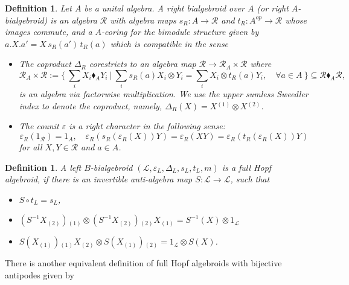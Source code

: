 \documentclass[a4paper,reqno]{amsart}
\numberwithin{equation}{section}
\theoremstyle{plain}
\newtheorem{defi}[thm]{Definition}
\theoremstyle{remark}
\numberwithin{equation}{section}
\newcommand{\ot}{\otimes}
\newcommand{\cL}{\mathcal{L}}
\newcommand{\cR}{\mathcal{R}}
\newcommand{\one}[1]{{#1}{}_{\scriptscriptstyle{(1)}}}
\newcommand{\two}[1]{{#1}{}_{\scriptscriptstyle{(2)}}}
\newcommand{\teins}[1]{{#1}{}{}^{\scriptscriptstyle{(1)}}}
\newcommand{\tzwei}[1]{{#1}{}{}^{\scriptscriptstyle{(2)}}}
\begin{document}
\begin{defi}\label{def:right.bgd} Let $A$ be a unital algebra. A right bialgebroid over $A$ (or right $A$-bialgebroid) is an algebra $\cR$ with  algebra maps $s_{R}:A\to \cR$ and $t_{R}:A^{op}\to \cR$ whose images commute,  and a $A$-coring for the bimodule structure given by $a.X.a'=X\,s_{R}(a')\,t_{R}(a)$ which is compatible in the sense
\begin{itemize}
\item[(i)] The coproduct $\Delta_{R}$ corestricts to an algebra map  $\cR\to \cR{}_{A}\times \cR$ where
\begin{equation*} \cR{}_{A}\times \cR :=\{\ \sum_i X_i \blacklozenge_{A} Y_i\ |\ \sum_i s_{R}(a)X_i \ot Y_i=
\sum_i X_i \ot  t_{R}(a)Y_i  ,\quad \forall a\in A\ \}\subseteq \cR\blacklozenge_{A}\cR,
\end{equation*}
 is an algebra via factorwise multiplication. We use the upper sumless Sweedler index to denote the coproduct, namely, $\Delta_{R}(X)=X\teins{}\ot X\tzwei{}$.
\item[(ii)] The counit $\varepsilon$ is a right character in the following sense:
\begin{equation*}\varepsilon_{R}(1_{\cR})=1_{A},\quad \varepsilon_{R}(s_{R}(\varepsilon_{R}(X))Y)=\varepsilon_{R}(XY)=\varepsilon_{R}(t_{R}(\varepsilon_{R}(X))Y)\end{equation*}
for all $X,Y\in \cR$ and $a\in A$.
\end{itemize}
\end{defi}

\begin{defi}\label{def. full Hopf algebroid1}
    A left $B$-bialgebroid $(\cL, \varepsilon_{L}, \Delta_{L}, s_{L}, t_{L}, m)$ is a full Hopf algebroid, if there is an invertible anti-algebra map $S:\cL\to \cL$, such that
    \begin{itemize}
        \item [(i)] $S\circ t_{L}=s_{L}$,
        \item [(ii)] $\one {(S^{-1}\two{X})} \ot \two {(S^{-1}\two{X})}\one{X}  = S^{-1}(X) \ot 1_\cL$
        \item [(iii)] $\one {S(\one{X})} \two{X} \ot \two{S(\one{X})}  = 1_\cL \ot S(X)$.
    \end{itemize}
\end{defi}


There is another equivalent definition of full Hopf algebroids with bijective antipodes given by \cite{BS}
\end{document}
